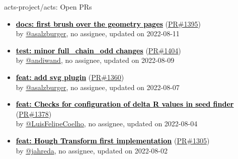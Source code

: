 \begin{frame}[allowframebreaks]{ acts-project/acts: Open PRs
}

  \begin{itemize}
    
    
    \item
    \propen\textbf{\href{https://github.com/acts-project/acts/pull/1395}{\textcolor{black}{docs: first brush over the geometry pages}}}
    (\href{https://github.com/acts-project/acts/pull/1395}{PR\#1395}) \\
    by \href{https://github.com/asalzburger}{@asalzburger}, {}no assignee, updated on 2022-08-11

    \item
    \propen\textbf{\href{https://github.com/acts-project/acts/pull/1404}{\textcolor{black}{test: minor full\_chain\_odd changes}}}
    (\href{https://github.com/acts-project/acts/pull/1404}{PR\#1404}) \\
    by \href{https://github.com/andiwand}{@andiwand}, {}no assignee, updated on 2022-08-09

    \item
    \propen\textbf{\href{https://github.com/acts-project/acts/pull/1360}{\textcolor{black}{feat: add svg plugin}}}
    (\href{https://github.com/acts-project/acts/pull/1360}{PR\#1360}) \\
    by \href{https://github.com/asalzburger}{@asalzburger}, {}no assignee, updated on 2022-08-07

    \item
    \propen\textbf{\href{https://github.com/acts-project/acts/pull/1378}{\textcolor{black}{feat: Checks for configuration of delta R values in seed finder}}}
    (\href{https://github.com/acts-project/acts/pull/1378}{PR\#1378}) \\
    by \href{https://github.com/LuisFelipeCoelho}{@LuisFelipeCoelho}, {}no assignee, updated on 2022-08-04

    \item
    \propen\textbf{\href{https://github.com/acts-project/acts/pull/1305}{\textcolor{black}{feat: Hough Transform first implementation}}}
    (\href{https://github.com/acts-project/acts/pull/1305}{PR\#1305}) \\
    by \href{https://github.com/jahreda}{@jahreda}, {}no assignee, updated on 2022-08-02

    
  \end{itemize}

\end{frame}






